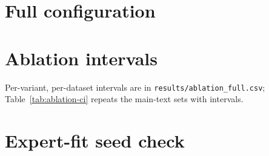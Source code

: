\documentclass[10pt]{article}
\begin{document}



\appendix
\section{Full configuration}
\label{app:config}


\section{Ablation intervals}
\label{app:ci}
Per-variant, per-dataset intervals are in \texttt{results/ablation\_full.csv}; Table~\ref{tab:ablation-ci} repeats the main-text sets with intervals.


\section{Expert-fit seed check}

\end{document}

